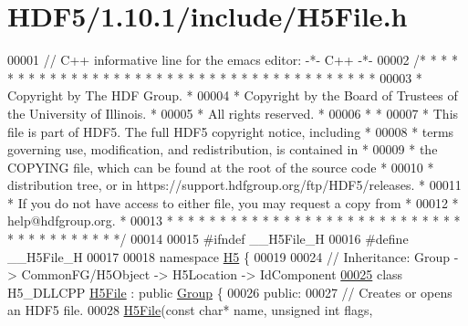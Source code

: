 \hypertarget{_h_d_f5_21_810_81_2include_2_h5_file_8h_source}{}\section{H\+D\+F5/1.10.1/include/\+H5\+File.h}
\label{_h_d_f5_21_810_81_2include_2_h5_file_8h_source}

\begin{DoxyCode}
00001 \textcolor{comment}{// C++ informative line for the emacs editor: -*- C++ -*-}
00002 \textcolor{comment}{/* * * * * * * * * * * * * * * * * * * * * * * * * * * * * * * * * * * * * * *}
00003 \textcolor{comment}{ * Copyright by The HDF Group.                                               *}
00004 \textcolor{comment}{ * Copyright by the Board of Trustees of the University of Illinois.         *}
00005 \textcolor{comment}{ * All rights reserved.                                                      *}
00006 \textcolor{comment}{ *                                                                           *}
00007 \textcolor{comment}{ * This file is part of HDF5.  The full HDF5 copyright notice, including     *}
00008 \textcolor{comment}{ * terms governing use, modification, and redistribution, is contained in    *}
00009 \textcolor{comment}{ * the COPYING file, which can be found at the root of the source code       *}
00010 \textcolor{comment}{ * distribution tree, or in https://support.hdfgroup.org/ftp/HDF5/releases.  *}
00011 \textcolor{comment}{ * If you do not have access to either file, you may request a copy from     *}
00012 \textcolor{comment}{ * help@hdfgroup.org.                                                        *}
00013 \textcolor{comment}{ * * * * * * * * * * * * * * * * * * * * * * * * * * * * * * * * * * * * * * */}
00014 
00015 \textcolor{preprocessor}{#ifndef \_\_H5File\_H}
00016 \textcolor{preprocessor}{#define \_\_H5File\_H}
00017 
00018 \textcolor{keyword}{namespace }\hyperlink{namespace_h5}{H5} \{
00019 
00024 \textcolor{comment}{//  Inheritance: Group -> CommonFG/H5Object -> H5Location -> IdComponent}
\hyperlink{class_h5_1_1_h5_file}{00025} \textcolor{keyword}{class }H5\_DLLCPP \hyperlink{class_h5_1_1_h5_file}{H5File} : \textcolor{keyword}{public} \hyperlink{class_h5_1_1_group}{Group} \{
00026    \textcolor{keyword}{public}:
00027         \textcolor{comment}{// Creates or opens an HDF5 file.}
00028         \hyperlink{class_h5_1_1_h5_file}{H5File}(\textcolor{keyword}{const} \textcolor{keywordtype}{char}* name, \textcolor{keywordtype}{unsigned} \textcolor{keywordtype}{int} flags,

\end{DoxyCode}
